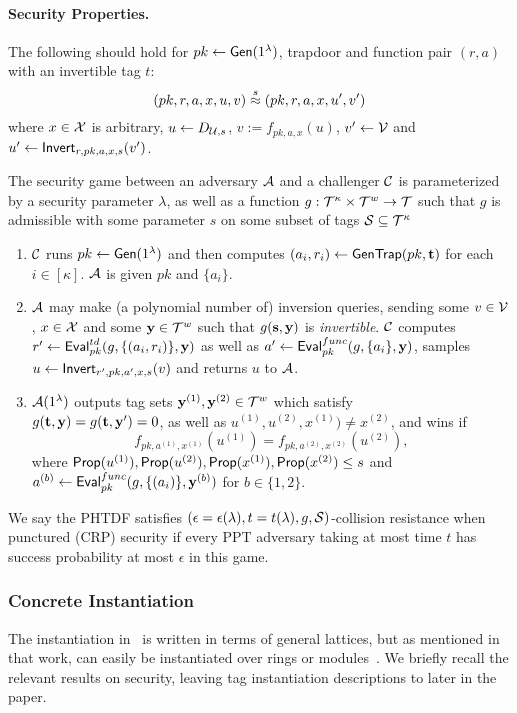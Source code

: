 \paragraph{Security Properties.} 

The following should hold for $pk \gets \mathsf{Gen}(1^\lambda)$,
trapdoor and function pair $(r,a)$ with an invertible tag $t$:
\[(pk,r,a,x,u,v) \stackrel{s}{\approx} (pk,r,a,x,u',v')\] where $x \in \mathcal{X}$ is arbitrary, $u \gets
D_{\mathcal{U},s}$, $v := f_{pk,a,x}(u)$, $v' \gets \mathcal{V}$ and $u' \gets
\mathsf{Invert}_{r,pk,a,x,s}(v')$.


The security game between an adversary $\mathcal{A}$ and a challenger $\mathcal{C}$
is parameterized by a security parameter $\lambda$, as well as a
function $g: \mathcal{T}^{\kappa} \times \mathcal{T}^{w} \to \mathcal{T}$ such that $g$
is admissible with some parameter $s$ on some subset of tags
$\mathcal{S} \subseteq \mathcal{T}^{\kappa}$
\begin{enumerate}[itemsep=1pt]

\item $\mathcal{C}$ runs $pk \gets \mathsf{Gen}(1^{\lambda})$ and then
  computes $(a_i, r_i) \gets \mathsf{GenTrap}(pk,\mathbf{t})$ for each $i \in
  [\kappa]$.  $\mathcal{A}$ is given $pk$ and $\{a_i\}$.
\item $\mathcal{A}$ may make (a polynomial number of) inversion queries, sending some $v \in
  \mathcal{V}$, $x \in \mathcal{X}$ and some $\mathbf{y} \in \mathcal{T}^{w}$ such that
  $g(\mathbf{s},\mathbf{y})$ is \emph{invertible}. $\mathcal{C}$ computes
  $r' \gets \mathsf{Eval}_{pk}^{td}(g,\{(a_i,r_i)\},\mathbf{y})$ as well as $a' \gets
  \mathsf{Eval}_{pk}^{func}(g,\{a_i\},\mathbf{y})$, samples $u \gets \mathsf{Invert}_{r',pk,a',x,s}(v)$ and returns
$u$ to $\mathcal{A}$. 
\item $\mathcal{A}(1^\lambda)$ outputs tag sets $\mathbf{y}^{(1)}, \mathbf{y}^{(2)} \in \mathcal{T}^{w}$ which satisfy\\
  $g(\mathbf{t},\mathbf{y})=g(\mathbf{t},\mathbf{y}')=0$, as well as
  $u^{(1)},u^{(2)}, x^{(1)}) \neq x^{(2)}$, and wins if
  \[f_{pk,a^{(1)},x^{(1)}}(u^{(1)})=f_{pk,a^{(2)},x^{(2)}}(u^{(2)}),\] where
  $\mathsf{Prop}(u^{(1)}),\mathsf{Prop}(u^{(2)}), \mathsf{Prop}(x^{(1)}),\mathsf{Prop}(x^{(2)})  \leq s$ and $a^{(b)} \gets
  \mathsf{Eval}_{pk}^{func}(g,\{(a_i)\}, \mathbf{y}^{(b)})$ for $b \in \{1,2\}$.
\end{enumerate}

We say the PHTDF satisfies
$(\epsilon=\epsilon(\lambda),t=t(\lambda),g,\mathcal{S})$-collision
resistance when punctured (CRP) security if every PPT adversary taking
at most time $t$ has success probability at most $\epsilon$ in this
game.

\subsubsection{Concrete Instantiation}
\label{ref:concrete_inst}
The instantiation in~\cite{DBLP:conf/pkc/Alperin-Sheriff15} is written
in terms of general lattices, but as mentioned in that work, can
easily be instantiated over rings or
modules~\cite{DBLP:journals/dcc/LangloisS15}. We briefly recall the
relevant results on security, leaving tag instantiation descriptions to later in
the paper.

